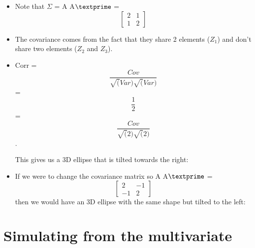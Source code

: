 \documentclass[12pt]{report}
\begin{document}
\begin{itemize}

\bigskip \item Note that  $\Sigma$ = A A$\textprime$ = \[  \begin{bmatrix}
    2 & 1  \\
    1 & 2
  \end{bmatrix}
\] 

\item The covariance comes from the fact that they share 2 elements ($Z_{1}$) and don't share two elements ($Z_{2}$ and $Z_{3}$).

\item Corr = \[\frac{Cov}{\sqrt(Var)\sqrt(Var)} \] = \[\frac{1}{2} \] =  \[\frac{Cov}{\sqrt(2)\sqrt(2)} \]. 

\bigskip
This gives us a 3D ellipse that is tilted towards the right:


\item If we were to change the covariance matrix so A A$\textprime$ =  \[  \begin{bmatrix}
    2 & -1  \\
    -1 & 2
  \end{bmatrix}
\] then we would have an 3D ellipse with the same shape but tilted to the left:


\end{itemize}
 
 \section{Simulating from the multivariate}
 
\end{document}

